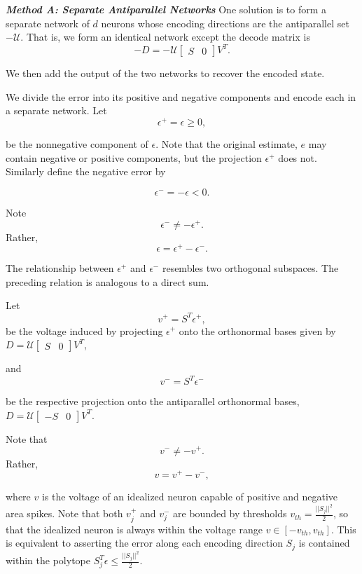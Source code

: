 \begin{enumerate}
\textbf{\textit{Method A: Separate Antiparallel Networks}} One solution is to form a separate network of $d$ neurons whose encoding directions are the antiparallel set $-\mathcal{U}$. That is, we form an identical network except the decode matrix is
$$ -D = -\mathcal{U} \begin{bmatrix} S & 0 \end{bmatrix} V^T.$$

We then add the output of the two networks to recover the encoded state. 


We divide the error into its positive and negative components and encode each in a separate network. Let
$$
\epsilon^{+} = \epsilon \geq 0,
$$

be the nonnegative component of $\epsilon$. Note that the original estimate, $e$ may contain negative or positive components, but the projection $\epsilon^{+}$ does not.  Similarly define the negative error by 

$$
\epsilon^{-} = -\epsilon < 0.
$$

Note
$$
\epsilon^{-} \neq -\epsilon^+. 
$$
Rather, 
$$
\epsilon = \epsilon^{+} - \epsilon^{-}.
$$

The relationship between $\epsilon^+$ and $\epsilon^-$ resembles two orthogonal subspaces. The preceding relation is analogous to a direct sum. 


Let
$$
v^{+} = S^T \epsilon^+, 
$$
be the voltage induced by projecting $\epsilon^+$ onto the orthonormal bases given by $D = \mathcal{U} \begin{bmatrix} S & 0 \end{bmatrix} V^T$,

and 
$$
v^{-} = S^T \epsilon^-
$$

be the respective projection onto the antiparallel orthonormal bases, $D = \mathcal{U} \begin{bmatrix} -S & 0 \end{bmatrix} V^T$.

Note that
$$
v^{-} \neq -v^+. 
$$
Rather, 
$$
v= v^{+} - v^{-}, 
$$

where $v$ is the voltage of an idealized neuron capable of positive and negative area spikes. Note that both $v_j^+$ and $v_j^-$ are bounded by thresholds $v_{th} = \frac{||S_j||^2}{2}$, so that the idealized neuron is always within the voltage range $v \in \left[ -v_{th}, v_{th} \right]$. This is equivalent to asserting the error along each encoding direction $S_j$ is contained within the polytope $S_j^T \epsilon \leq \frac{||S_j||^2}{2}$. 


\end{enumerate}
